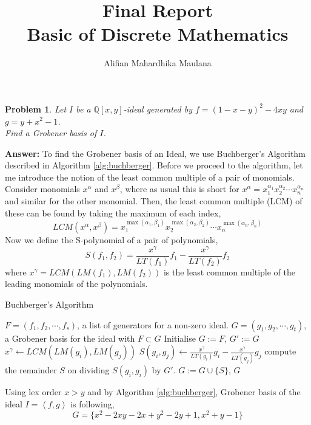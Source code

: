 \documentclass[a4paper,12pt]{article}
\title{Final Report \\ Basic of Discrete Mathematics}
\author{Alifian Mahardhika Maulana}
\newtheorem{prob}{Problem}[]
\theoremstyle{definition}
\newcommand{\Q}{\mathbb{Q}}
\begin{document}
\maketitle
\begin{prob}
	Let $I$ be a $\Q[x,y]$-ideal generated by $f=(1-x-y)^2-4xy$ and $g=y+x^2-1$.\\ Find a Grobener basis of $I$.
\end{prob}
\textbf{Answer:}
To find the Grobener basis of an Ideal, we use Buchberger's Algorithm described in Algorithm \ref{alg:buchberger}. Before we proceed to the algorithm, let me introduce the notion of the least common multiple of a pair of monomials. Consider monomials $x^\alpha$ and $x^\beta$, where as usual this is short for $x^\alpha = x_1^{\alpha_1}x_2^{\alpha_2}\cdots x_n^{\alpha_n}$ and similar for the other monomial. Then, the least common multiple (LCM) of these can be found by taking the maximum of each index,
\begin{equation*}
LCM(x^\alpha,x^\beta) = x_1^{\max(\alpha_1,\beta_1)}x_2^{\max(\alpha_2,\beta_2)}\cdots x_n^{\max(\alpha_n,\beta_n)}
\end{equation*}
Now we define the S-polynomial of a pair of polynomials,
\begin{equation*}
S(f_1,f_2) = \frac{x^\gamma}{LT(f_1)}f_1 - \frac{x^\gamma}{LT(f_2)}f_2
\end{equation*}
where $x^\gamma = LCM(LM(f_1),LM(f_2))$ is the least common multiple of the leading monomials of the polynomials.
\begin{algorithm}[H] %
	\caption{Buchberger's Algorithm} %
	\label{alg:buchberger} %
	\begin{algorithmic} %
		\Require $F = (f_1,f_2,\cdots,f_s)$, a list of generators for a non-zero ideal.
		\Ensure $G = (g_1,g_2,\cdots,g_t)$, a Grobener basis for the ideal with $F\subset G$
		\State Initialise $G:=F$,
		\Repeat
		\State $G':=G$
		\State $x^\gamma \leftarrow LCM(LM(g_i),LM(g_j))$
		\State $S(g_i,g_j) \leftarrow \frac{x^\gamma}{LT(g_i)}g_i - \frac{x^\gamma}{LT(g_j)}g_j$
		\State compute the remainder $S$ on dividing $S(g_i,g_i)$ by $G'$.
		\State $G:=G\cup \{S\}$,
		\EndIf
		\EndFor
		\Return $G$
	\end{algorithmic}
\end{algorithm}
Using lex order $x>y$ and by Algorithm \ref{alg:buchberger}, Grobener basis of the ideal $I=\left< f,g \right>$ is following,
\begin{equation*}
G = \{x^2-2xy-2x+y^2-2y+1, x^2+y-1\}
\end{equation*}
\end{document}
